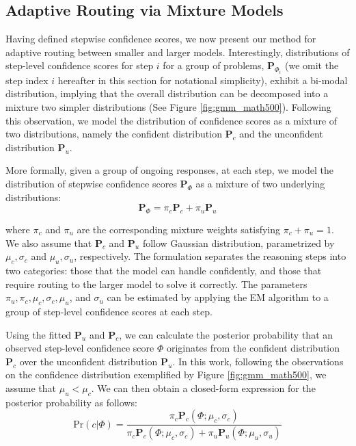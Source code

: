 \documentclass[letterpaper]{article} %
\begin{document}
\subsection{Adaptive Routing via Mixture Models} 
Having defined stepwise confidence scores, we now present our method for adaptive routing between smaller and larger models. Interestingly, distributions of step-level confidence scores for step $i$ for a group of problems, $\mathbf{P}_{\Phi_i}$ (we omit the step index $i$ hereafter in this section for notational simplicity), exhibit a bi-modal distribution, implying that the overall distribution can be decomposed into a mixture two simpler distributions (See Figure \ref{fig:gmm_math500}). Following this observation, we model the distribution of confidence scores as a mixture of two distributions, namely the confident distribution $\mathbf{P}_c$ and the unconfident distribution $\mathbf{P}_u$. 

More formally, given a group of ongoing responses, at each step, we model the distribution of stepwise confidence scores $\mathbf{P}_\Phi$ as a mixture of two underlying distributions:
\begin{equation}
    \mathbf{P}_\Phi = \pi_c \mathbf{P}_c + \pi_u \mathbf{P}_u
\end{equation}

\noindent where $\pi_c$ and $\pi_u$ are the corresponding mixture weights satisfying $\pi_c+ \pi_u=1$. We also  assume that $\mathbf{P}_c$ and $\mathbf{P}_u$ follow Gaussian distribution, parametrized by $\mu_c, \sigma_c$ and $\mu_u, \sigma_u$, respectively. The formulation separates the reasoning steps into two categories: those that the model can handle confidently, and those that require routing to the larger model to solve it correctly. The parameters $\pi_u, \pi_c, \mu_c, \sigma_c, \mu_u$, and $\sigma_u$ can be estimated by applying the EM algorithm to a group of step-level confidence scores at each step.

Using the fitted $\mathbf{P}_u$ and $\mathbf{P}_c$, we can calculate the posterior probability that an observed step-level confidence score $\Phi$ originates from the confident distribution $\mathbf{P}_c$ over the unconfident distribution $\mathbf{P}_u$. 
In this work, following the observations on the confidence distribution exemplified by Figure \ref{fig:gmm_math500}, we assume %
that $\mu_u < \mu_c$. We can then obtain a closed-form expression for the posterior probability as follows:
\begin{equation}
    \text{Pr}(c|\Phi) = \frac{\pi_c\mathbf{P}_c(\Phi; \mu_c, \sigma_c)}{\pi_c \mathbf{P}_c(\Phi; \mu_c, \sigma_c) + \pi_u \mathbf{P}_u(\Phi; \mu_u, \sigma_u)}
\end{equation}
\end{document}
